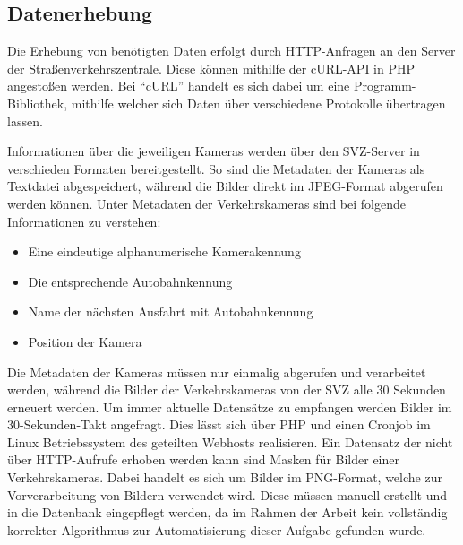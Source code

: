 \subsection{Datenerhebung}
\label{sec:datenerhebung}
Die Erhebung von benötigten Daten erfolgt durch HTTP-Anfragen an den Server der Straßenverkehrszentrale. Diese können mithilfe der cURL-API in PHP angestoßen werden. Bei "`cURL"' handelt es sich dabei um eine Programm-Bibliothek, mithilfe welcher sich Daten über verschiedene Protokolle übertragen lassen.

Informationen über die jeweiligen Kameras werden über den SVZ-Server in verschieden Formaten bereitgestellt. So sind die Metadaten der Kameras als Textdatei abgespeichert, während die Bilder direkt im JPEG-Format abgerufen werden können. Unter Metadaten der Verkehrskameras sind bei folgende Informationen zu verstehen: 
\begin{itemize}
\item{Eine eindeutige alphanumerische Kamerakennung}
\item{Die entsprechende Autobahnkennung}
\item{Name der nächsten Ausfahrt mit Autobahnkennung}
\item{Position der Kamera}
\end{itemize}
Die Metadaten der Kameras müssen nur einmalig abgerufen und verarbeitet werden, während die Bilder der Verkehrskameras von der SVZ alle 30 Sekunden erneuert werden. 
Um immer aktuelle Datensätze zu empfangen werden Bilder im 30-Sekunden-Takt angefragt. Dies lässt sich über PHP und einen Cronjob im Linux Betriebssystem des geteilten Webhosts realisieren.
Ein Datensatz der nicht über HTTP-Aufrufe erhoben werden kann sind Masken für Bilder einer Verkehrskameras.
Dabei handelt es sich um Bilder im PNG-Format, welche zur Vorverarbeitung von Bildern verwendet wird. Diese müssen manuell erstellt und in die Datenbank eingepflegt werden, da im Rahmen der Arbeit kein vollständig korrekter Algorithmus zur Automatisierung dieser Aufgabe gefunden wurde.

